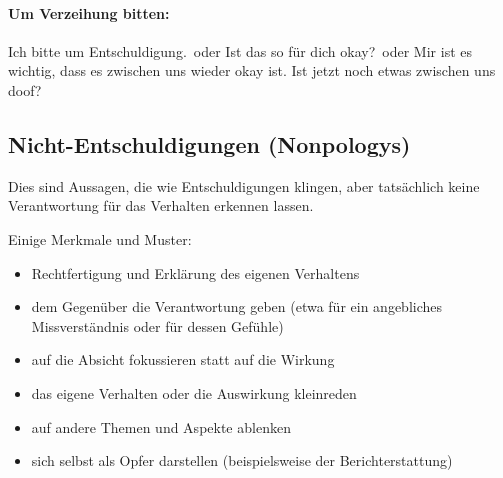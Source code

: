 \paragraph{Um Verzeihung bitten:} \glqq Ich bitte um Entschuldigung.\grqq\ oder \glqq Ist das so für dich okay?\grqq\ oder \glqq Mir ist es wichtig, dass es zwischen uns wieder okay ist. Ist jetzt noch etwas zwischen uns doof?\grqq


\subsection{Nicht-Entschuldigungen (Nonpologys)}

Dies sind Aussagen, die wie Entschuldigungen klingen, aber tatsächlich keine Verantwortung für das Verhalten erkennen lassen.

Einige Merkmale und Muster:

\begin{itemize}
  \item Rechtfertigung und Erklärung des eigenen Verhaltens
  \item dem Gegenüber die Verantwortung geben (etwa für ein angebliches Missverständnis oder für dessen Gefühle)
  \item auf die Absicht fokussieren statt auf die Wirkung
  \item das eigene Verhalten oder die Auswirkung kleinreden
  \item auf andere Themen und Aspekte ablenken
  \item sich selbst als Opfer darstellen (beispielsweise der Berichterstattung)
\end{itemize}
